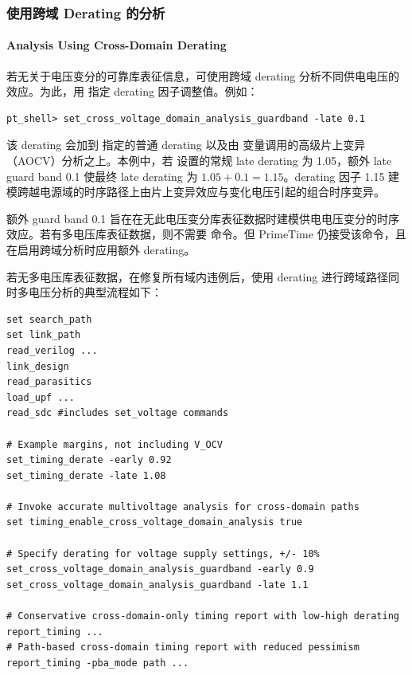 \subsubsection{使用跨域 Derating 的分析}
\paragraph*{Analysis Using Cross-Domain Derating}

若无关于电压变分的可靠库表征信息，可使用跨域 derating 分析不同供电电压的效应。为此，用  指定 derating 因子调整值。例如：
\begin{lstlisting}
pt_shell> set_cross_voltage_domain_analysis_guardband -late 0.1
\end{lstlisting}

该 derating 会加到  指定的普通 derating 以及由  变量调用的高级片上变异（AOCV）分析之上。本例中，若  设置的常规 late derating 为 1.05，额外 late guard band 0.1 使最终 late derating 为 $1.05 + 0.1 = 1.15$。derating 因子 1.15 建模跨越电源域的时序路径上由片上变异效应与变化电压引起的组合时序变异。

额外 guard band 0.1 旨在在无此电压变分库表征数据时建模供电电压变分的时序效应。若有多电压库表征数据，则不需要  命令。但 PrimeTime 仍接受该命令，且在启用跨域分析时应用额外 derating。

若无多电压库表征数据，在修复所有域内违例后，使用 derating 进行跨域路径同时多电压分析的典型流程如下：
\begin{lstlisting}
set search_path
set link_path
read_verilog ...
link_design
read_parasitics
load_upf ...
read_sdc #includes set_voltage commands

# Example margins, not including V_OCV
set_timing_derate -early 0.92
set_timing_derate -late 1.08

# Invoke accurate multivoltage analysis for cross-domain paths
set timing_enable_cross_voltage_domain_analysis true

# Specify derating for voltage supply settings, +/- 10%
set_cross_voltage_domain_analysis_guardband -early 0.9
set_cross_voltage_domain_analysis_guardband -late 1.1

# Conservative cross-domain-only timing report with low-high derating
report_timing ...
# Path-based cross-domain timing report with reduced pessimism
report_timing -pba_mode path ...
\end{lstlisting}
